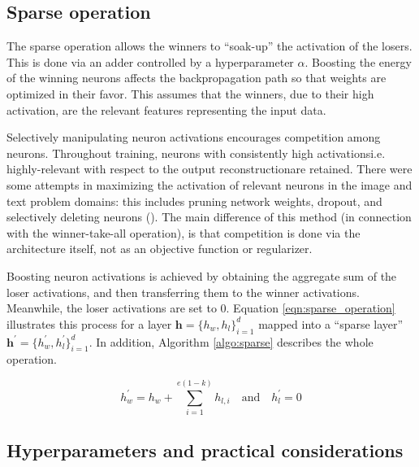 

\subsection{Sparse operation}

\par The sparse operation allows the winners to ``soak-up'' the activation of
the losers. This is done via an adder controlled by a hyperparameter
$\alpha$. Boosting the energy of the winning neurons affects the
backpropagation path so that weights are optimized in their favor. This
assumes that the winners, due to their high activation, are the relevant
features representing the input data.

\par Selectively manipulating neuron activations encourages competition among
neurons. Throughout training, neurons with consistently high
activations\textemdash i.e. highly-relevant with respect to the output
reconstruction\textemdash are retained. There were some attempts in
maximizing the activation of relevant neurons in the image and text problem
domains: this includes pruning network weights, dropout, and selectively
deleting neurons (\cite{louizos2017learning, chen2017kate, theis2018faster}).
The main difference of this method (in connection with the winner-take-all
operation), is that competition is done via the architecture itself, not as
an objective function or regularizer.

\par Boosting neuron activations is achieved by obtaining the aggregate sum
of the loser activations, and then transferring them to the winner
activations. Meanwhile, the loser activations are set to $0$. Equation
\ref{eqn:sparse_operation} illustrates this process for a layer $\mathbf{h} =
\{h_{w}, h_{l}\}_{i=1}^{d}$ mapped into a ``sparse layer''
$\mathbf{h}^{\prime} = \{h^{\prime}_w, h^{\prime}_l\}_{i=1}^{d}$. In
addition, Algorithm \ref{algo:sparse} describes the whole operation.

\begin{equation}
  \label{eqn:sparse_operation}
  h^{\prime}_{w} = h_{w} + \sum_{i=1}^{e(1-k)}h_{l,i} \quad \text{and} \quad h^{\prime}_l = 0 
\end{equation}



\subsection{Hyperparameters and practical considerations}

